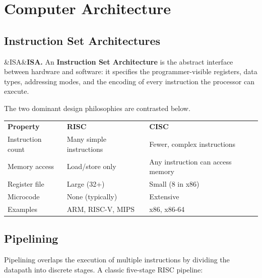 \documentclass[12pt,a4paper]{article}
\newenvironment{Def}[1][]{%
  \begin{tcolorbox}[defbox]\ifx&#1&\else\textbf{#1.}\enspace\fi}{\end{tcolorbox}}
\begin{document}
\section{Computer Architecture}

\subsection{Instruction Set Architectures}

\begin{Def}[ISA]
  An \textbf{Instruction Set Architecture} is the abstract interface between hardware
  and software: it specifies the programmer-visible registers, data types, addressing
  modes, and the encoding of every instruction the processor can execute.
\end{Def}

The two dominant design philosophies are contrasted below.

\begin{center}
\begin{tabularx}{\linewidth}{L{3.2cm} X X}
  \color{white}\textbf{Property} &
  \color{white}\textbf{RISC} &
  \color{white}\textbf{CISC} \\
  Instruction count & Many simple instructions & Fewer, complex instructions \\
  Memory access     & Load/store only          & Any instruction can access memory \\
  Register file     & Large (32+)              & Small (8 in x86) \\
  Microcode         & None (typically)         & Extensive \\
  Examples          & ARM, RISC-V, MIPS        & x86, x86-64 \\
\end{tabularx}
\end{center}

\subsection{Pipelining}

Pipelining overlaps the execution of multiple instructions by dividing the datapath
into discrete stages. A classic five-stage RISC pipeline:
\end{document}
